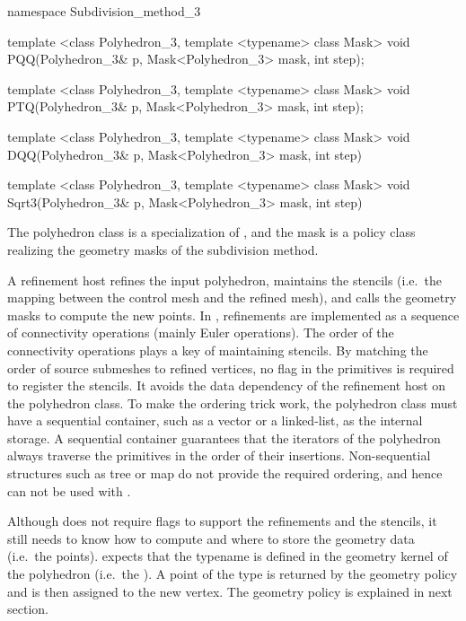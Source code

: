 \begin{ccExampleCode}
namespace Subdivision_method_3 {
  template <class Polyhedron_3, template <typename> class Mask>
  void PQQ(Polyhedron_3& p, Mask<Polyhedron_3> mask, int step);

  template <class Polyhedron_3, template <typename> class Mask>
  void PTQ(Polyhedron_3& p, Mask<Polyhedron_3> mask, int step);

  template <class Polyhedron_3, template <typename> class Mask>
  void DQQ(Polyhedron_3& p, Mask<Polyhedron_3> mask, int step)

  template <class Polyhedron_3, template <typename> class Mask>
  void Sqrt3(Polyhedron_3& p, Mask<Polyhedron_3> mask, int step)
}
\end{ccExampleCode}


The polyhedron class is a specialization of
, and the mask is a policy 
class realizing the geometry masks of the subdivision 
method.

A refinement host refines the input polyhedron, maintains 
the stencils (i.e.~the mapping between the control mesh 
and the refined mesh), and calls the geometry masks
to compute the new points. 
In , refinements are implemented
as a sequence of connectivity operations (mainly Euler operations).
The order of the connectivity operations plays a key of maintaining
stencils. By matching the order of source submeshes to refined 
vertices, no flag in the primitives is required to register the stencils. 
It avoids the data dependency of the refinement host on the polyhedron class. 
To make the ordering trick work, the polyhedron class must 
have a sequential container, such as a vector or a linked-list, as
the internal storage. 
A sequential container guarantees that the iterators of the 
polyhedron always traverse the primitives in the order of their 
insertions. Non-sequential structures such as 
tree or map do not provide the required ordering, and hence
can not be used with .
 
Although  does not require flags
to support the refinements and the stencils, it
still needs to know how to compute and where to store the geometry
data (i.e.~the points).  
expects that the typename  is 
defined in the geometry kernel of the polyhedron
(i.e.~the ). 
A point of the type  is returned by the geometry 
policy and is then assigned to the new vertex.  
The geometry policy is explained in next section. 

